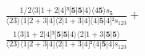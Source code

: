 \documentclass[varwidth, border=5pt]{standalone}
\begin{document}
\begin{my}
$\begin{gathered}
\scriptscriptstyle\frac{1/2⟨3|1+2|4]³[𝟓|𝟓|4⟩⟨4𝟓⟩s_{𝟓}}{⟨23⟩⟨1|2+3|4]⟨2|1+3|4]⟨4|𝟓|4]²s_{123}} +\\
\scriptscriptstyle\frac{1⟨3|1+2|4]³[𝟓|𝟓|4⟩⟨2|1+3|𝟓|𝟓⟩}{⟨23⟩⟨1|2+3|4]⟨2|1+3|4]²⟨4|𝟓|4]s_{123}} \phantom{+}
\end{gathered}$
\end{my}
\end{document}
